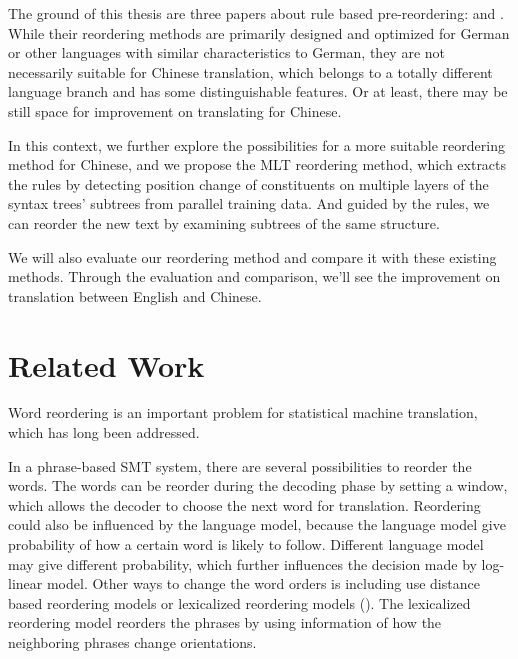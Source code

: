 The ground of this thesis are three papers about rule based pre-reordering: \cite{short, long} and \cite{tree}. While their reordering methods are primarily designed and optimized for German or other languages with similar characteristics to German, they are not necessarily suitable for Chinese translation, which belongs to a totally different language branch and has some distinguishable features. Or at least, there may be still space for improvement on translating for Chinese.

In this context, we further explore the possibilities for a more suitable reordering method for Chinese, and we propose the MLT reordering method, which extracts the rules by detecting position change of constituents on multiple layers of the syntax trees' subtrees from parallel training data. And guided by the rules, we can reorder the new text by examining subtrees of the same structure.

We will also evaluate our reordering method and compare it with these existing methods. Through the evaluation and comparison, we'll see the improvement on translation between English and Chinese. 




\section{Related Work}
\label{ch:Introduction:sec:RelatedWork}

Word reordering is an important problem for statistical machine translation, which has long been addressed.

In a phrase-based SMT system, there are several possibilities to reorder the words. The words can be reorder during the decoding phase by setting a window, which allows the decoder to choose the next word for translation. Reordering could also be influenced by the language model, because the language model give probability of how a certain word is likely to follow. Different language model may give different probability, which further influences the decision made by log-linear model. Other ways to change the word orders is including use distance based reordering models or lexicalized reordering models (\cite{tillmann2004, koehn2005}). The lexicalized reordering model reorders the phrases by using information of how the neighboring phrases change orientations.

